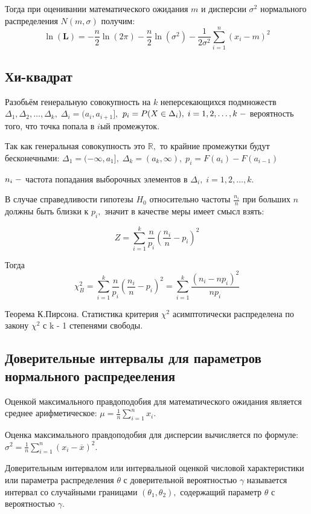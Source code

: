 \documentclass[a4]{article}
\begin{document}
						Тогда при оценивании математического ожидания $m$ и дисперсии $\sigma^2$ нормального распределения $N(m,\sigma)$ получим:
						$$\ln(\mathbf{L})=-\frac{n}{2}\ln(2\pi)-\frac{n}{2}\ln\left(\sigma^2\right)-\frac{1}{2\sigma^2}\sum\limits_{i=1}^n(x_i-m)^2
						$$
						\subsection{Хи-квадрат}
						Разобьём генеральную совокупность на $k$ неперсекающихся подмножеств $\Delta_1, \Delta_2,\ldots, \Delta_k,\;\Delta_i = (a_i,a_{i+1}],$ $p_i = P(X\in\Delta_i),\;i=1,2,\ldots,k\; \--$ вероятность того, что точка попала в $i$ый промежуток.
						
						Так как генеральная совокупность это $\mathbb{R},$ то крайние промежутки будут бесконечными: $\Delta_1=(-\infty,a_1],\;\Delta_k=(a_k,\infty),\;p_i = F(a_i)-F(a_{i-1})$
						
						$n_i\;\--$ частота попадания выборочных элементов в $\Delta_i,\;i=1,2,\ldots,k.$
						
						В случае справедливости гипотезы $H_0$ относительно частоты $\frac{n_i}{n}$ при больших $n$ должны быть близки к $p_i,$ значит в качестве меры имеет смысл взять: 
						
						$$Z = \sum\limits_{i=1}^k\frac{n}{p_i}\left(\frac{n_i}{n}-p_i\right)^2$$
						
						Тогда
						$$\chi^2_B=\sum\limits_{i=1}^k\frac{n}{p_i}\left(\frac{n_i}{n}-p_i\right)^2=\sum\limits_{i=1}^k\frac{(n_i-np_i)^2}{np_i}
						$$
						
						Теорема К.Пирсона. Статистика критерия $\chi^2$ асимптотически распределена по закону $\chi^2$ с k - 1 степенями свободы.
						
						\subsection{Доверительные интервалы для параметров нормального распредееления}
						Оценкой максимального правдоподобия для математического ожидания  является среднее арифметическое: $\mu=\frac{1}{n}\sum\limits_{i=1}^nx_i.$
						
						Оценка максимального правдоподобия для дисперсии вычисляется по формуле: $\sigma^2 = \frac{1}{n}\sum\limits_{i=1}^n(x_i-\overline{x})^2.$
						
						Доверительным интервалом или интервальной оценкой числовой характеристики или параметра распределения $\theta$ с доверительной вероятностью $\gamma$ называется интервал со случайными границами $(\theta_1,\theta_2),$ содержащий параметр $\theta$ с вероятностью $\gamma$.
						
\end{document}
